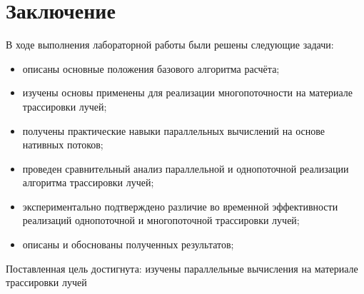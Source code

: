 \chapter*{Заключение}

В ходе выполнения лабораторной работы были решены следующие задачи:

\begin{itemize}[label=---]
	\item описаны основные положения базового алгоритма расчёта;
	\item изучены основы применены для реализации многопоточности на материале трассировки лучей;
	\item получены практические навыки параллельных вычислений на основе нативных потоков;
	\item проведен сравнительный анализ параллельной и однопоточной реализации алгоритма трассировки лучей;
	\item экспериментально подтверждено различие во временной эффективности реализаций однопоточной и многопоточной трассировки лучей;
	\item описаны и обоснованы полученных результатов;
\end{itemize}

Поставленная цель достигнута: изучены параллельные вычисления на материале трассировки лучей

